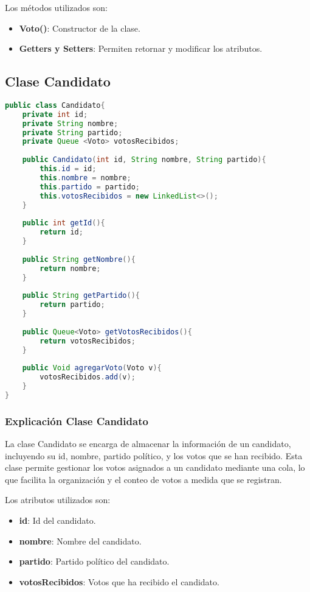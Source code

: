\documentclass[12pt]{article}
\begin{document}
Los métodos utilizados son:
\begin{itemize}
    \item \textbf{Voto()}: Constructor de la clase.
    \item \textbf{Getters y Setters}: Permiten retornar y modificar los atributos. 
\end{itemize}


\pagebreak

\subsection{Clase Candidato}

\begin{lstlisting}[language=Java,style=mystyle] 
public class Candidato{
    private int id;
    private String nombre;
    private String partido;
    private Queue <Voto> votosRecibidos;
    
    public Candidato(int id, String nombre, String partido){
        this.id = id;
        this.nombre = nombre;
        this.partido = partido;
        this.votosRecibidos = new LinkedList<>();
    }
    
    public int getId(){
        return id;
    }
    
    public String getNombre(){
        return nombre;
    }
    
    public String getPartido(){
        return partido;
    }
    
    public Queue<Voto> getVotosRecibidos(){
        return votosRecibidos;
    }
    
    public Void agregarVoto(Voto v){
        votosRecibidos.add(v);
    }
}
\end{lstlisting}
\pagebreak
\subsubsection{Explicación Clase Candidato}

La clase Candidato se encarga de almacenar la información de un candidato, incluyendo su id, nombre, partido político, y los votos que se han recibido. Esta clase permite gestionar los votos asignados a un candidato mediante una cola, lo que facilita la organización y el conteo de votos a medida que se registran.

Los atributos utilizados son:
\begin{itemize}
    \item \textbf{id}: Id del candidato.
    \item \textbf{nombre}: Nombre del candidato.
    \item \textbf{partido}: Partido político del candidato.
    \item \textbf{votosRecibidos}: Votos que ha recibido el candidato.
\end{itemize}
\end{document}

